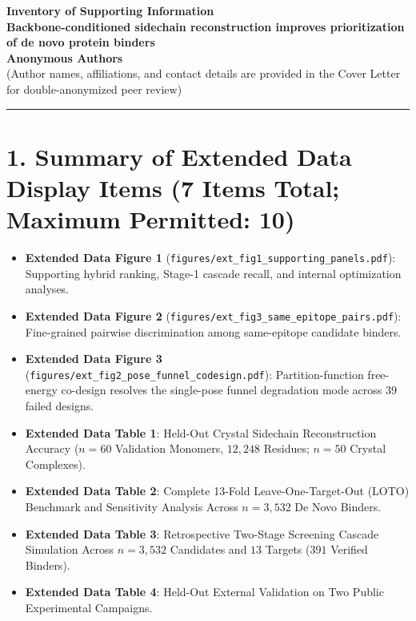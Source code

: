\documentclass[11pt]{article}
\begin{document}
\begin{center}
    {\Large \textbf{Inventory of Supporting Information}}\\[0.5em]
    {\large \textbf{Backbone-conditioned sidechain reconstruction improves prioritization of de novo protein binders}}\\[0.35em]
    \textbf{Anonymous Authors}\\
    \small (Author names, affiliations, and contact details are provided in the Cover Letter for double-anonymized peer review)
\end{center}

\vspace{0.5em}
\hrule
\vspace{0.75em}

\section*{1. Summary of Extended Data Display Items (7 Items Total; Maximum Permitted: 10)}
\begin{itemize}
    \item \textbf{Extended Data Figure 1} (\texttt{figures/ext\_fig1\_supporting\_panels.pdf}): Supporting hybrid ranking, Stage-1 cascade recall, and internal optimization analyses.
    \item \textbf{Extended Data Figure 2} (\texttt{figures/ext\_fig3\_same\_epitope\_pairs.pdf}): Fine-grained pairwise discrimination among same-epitope candidate binders.
    \item \textbf{Extended Data Figure 3} (\texttt{figures/ext\_fig2\_pose\_funnel\_codesign.pdf}): Partition-function free-energy co-design resolves the single-pose funnel degradation mode across 39 failed designs.
    \item \textbf{Extended Data Table 1}: Held-Out Crystal Sidechain Reconstruction Accuracy ($n = 60$ Validation Monomers, $12,248$ Residues; $n = 50$ Crystal Complexes).
    \item \textbf{Extended Data Table 2}: Complete 13-Fold Leave-One-Target-Out (LOTO) Benchmark and Sensitivity Analysis Across $n = 3,532$ De Novo Binders.
    \item \textbf{Extended Data Table 3}: Retrospective Two-Stage Screening Cascade Simulation Across $n = 3,532$ Candidates and $13$ Targets ($391$ Verified Binders).
    \item \textbf{Extended Data Table 4}: Held-Out External Validation on Two Public Experimental Campaigns.
\end{itemize}
\end{document}
